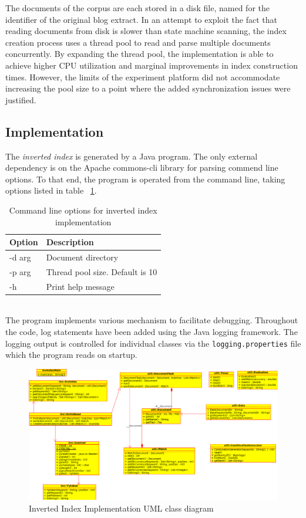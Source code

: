 \documentclass[10pt]{report}
\begin{document}
The documents of the corpus are each stored in a disk file, named for
the identifier of the original blog extract. In an attempt to exploit
the fact that reading documents from disk is slower than state machine
scanning, the index creation process uses a thread pool to read and
parse multiple documents concurrently. By expanding the thread pool,
the implementation is able to achieve higher CPU utilization and
marginal improvements in index construction times. However, the limits
of the experiment platform did not accommodate increasing the pool
size to a point where the added synchronization issues were justified.


\subsection*{Implementation}
The \textit{inverted index} is generated by a Java
program. The only external dependency is on the Apache commons-cli
library for parsing commend line options. To that end, the program is
operated from the command line, taking options listed in table
~\ref{tab:invcommandline}.  
\\
\begin{table}[h]
  \centering
  \begin{tabular}{ |l|p{10cm}|} 
    \hline
    Option & Description \\ \hline
    -d \<arg\>  &  Document directory \\ \hline
    -p \<arg\>  &  Thread pool size. Default is 10 \\ \hline
    -h          &  Print help message \\ \hline
  \end{tabular}
  \caption{Command line options for inverted index implementation}
  \label{tab:invcommandline}
\end{table}
\\

The program implements various mechanism to facilitate
debugging. Throughout the code, log statements have been added using
the Java logging framework. The logging output is controlled for
individual classes via the \texttt{logging.properties} file which the
program reads on startup.

\begin{figure}
  \begin{center}
	\includegraphics[angle=90,width=!,height=0.90\textheight]{invuml}
  \end{center}
  \caption{Inverted Index Implementation UML class diagram}
  \label{fig:invuml}
\end{figure} 
\end{document}
